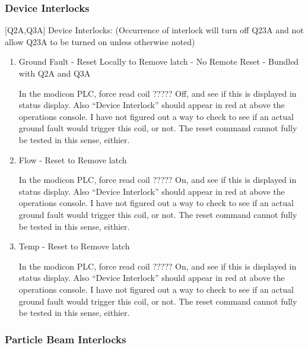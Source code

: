 \documentclass[11pt]{book}		%
\begin{document}
\subsubsection{Device Interlocks}\label{sect:cyc-equip-ctl-beamline-quad23a-state-monitors-device-interlocks}

[Q2A,Q3A] Device Interlocks:
(Occurrence of interlock will turn off Q23A and not allow Q23A to be turned on unless otherwise noted)

\begin{enumerate}
 \item [Q2A,Q3A] Ground Fault - Reset Locally to Remove latch - No Remote Reset - Bundled with Q2A and Q3A

\color{red}
In the modicon PLC, force read coil ????? Off, and see if this is displayed in status display. Also ``Device Interlock'' should appear in red at above the operations console. I have not figured out a way to check to see if an actual ground fault would trigger this coil, or not. The reset command cannot fully be tested in this sense, eithier.
\color{black}

 \item [Q2A,Q3A] Flow - Reset to Remove latch

\color{red}
In the modicon PLC, force read coil ????? On, and see if this is displayed in status display. Also ``Device Interlock'' should appear in red at above the operations console. I have not figured out a way to check to see if an actual ground fault would trigger this coil, or not. The reset command cannot fully be tested in this sense, eithier.
\color{black}

 \item [Q2A,Q3A] Temp - Reset to Remove latch

\color{red}
In the modicon PLC, force read coil ????? On, and see if this is displayed in status display. Also ``Device Interlock'' should appear in red at above the operations console. I have not figured out a way to check to see if an actual ground fault would trigger this coil, or not. The reset command cannot fully be tested in this sense, eithier.
\color{black}

\end{enumerate}

\subsubsection{Particle Beam Interlocks}\label{sect:cyc-equip-ctl-beamline-quad23a-state-monitors-beam-interlocks}
\end{document}
